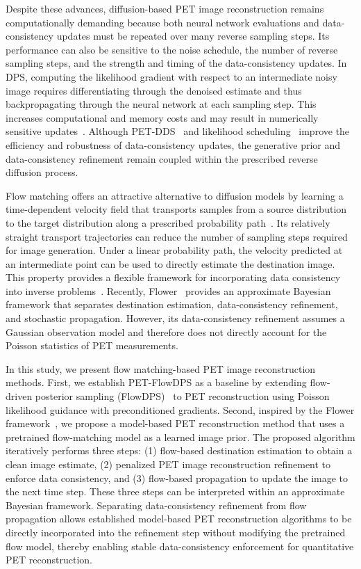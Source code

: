 \documentclass[journal]{IEEEtran}
\begin{document}
Despite these advances, diffusion-based PET image reconstruction remains computationally demanding because both neural network evaluations and data-consistency updates must be repeated over many reverse sampling steps. Its performance can also be sensitive to the noise schedule, the number of reverse sampling steps, and the strength and timing of the data-consistency updates. In DPS, computing the likelihood gradient with respect to an intermediate noisy image requires differentiating through the denoised estimate and thus backpropagating through the neural network at each sampling step. This increases computational and memory costs and may result in numerically sensitive updates~\cite{chung2024decomposed}. Although PET-DDS~\cite{singh_2024} and likelihood scheduling~\cite{webber2025lisch} improve the efficiency and robustness of data-consistency updates, the generative prior and data-consistency refinement remain coupled within the prescribed reverse diffusion process.

Flow matching offers an attractive alternative to diffusion models by learning a time-dependent velocity field that transports samples from a source distribution to the target distribution along a prescribed probability path~\cite{liu2023}. Its relatively straight transport trajectories can reduce the number of sampling steps required for image generation. Under a linear probability path, the velocity predicted at an intermediate point can be used to directly estimate the destination image. This property provides a flexible framework for incorporating data consistency into inverse problems~\cite{Kim_2025_ICCV,pourya2026flower, Martin2025PnPFlow, 11584907}. Recently, Flower~\cite{pourya2026flower} provides an approximate Bayesian framework that separates destination estimation, data-consistency refinement, and stochastic propagation. However, its data-consistency refinement assumes a Gaussian observation model and therefore does not directly account for the Poisson statistics of PET measurements.

In this study, we present flow matching-based PET image reconstruction methods. First, we establish PET-FlowDPS as a baseline by extending flow-driven posterior sampling (FlowDPS)~\cite{Kim_2025_ICCV} to PET reconstruction using Poisson likelihood guidance with preconditioned gradients. Second, inspired by the Flower framework~\cite{pourya2026flower}, we propose a model-based PET reconstruction method that uses a pretrained flow-matching model as a learned image prior. The proposed algorithm iteratively performs three steps: (1) flow-based destination estimation to obtain a clean image estimate, (2) penalized PET image reconstruction refinement to enforce data consistency, and (3) flow-based propagation to update the image to the next time step. These three steps can be interpreted within an approximate Bayesian framework. Separating data-consistency refinement from flow propagation allows established model-based PET reconstruction algorithms to be directly incorporated into the refinement step without modifying the pretrained flow model, thereby enabling stable data-consistency enforcement for quantitative PET reconstruction.
\end{document}
